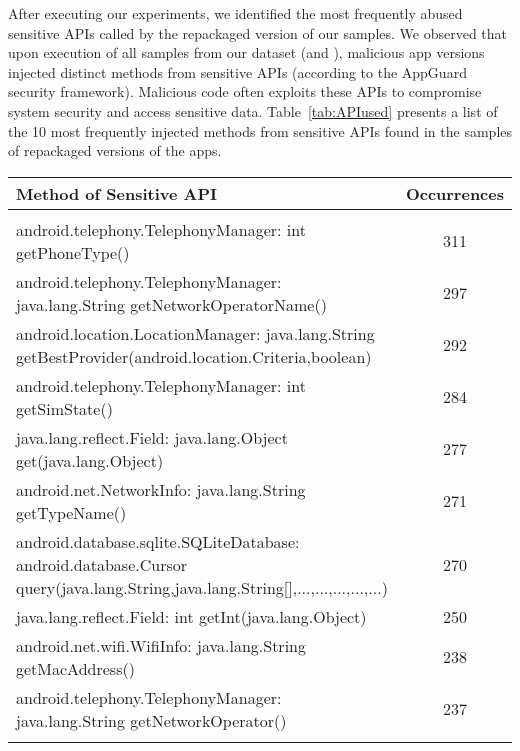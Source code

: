 After executing our experiments, we identified the  most frequently abused sensitive APIs called by the repackaged version of our samples.
We observed that upon execution of all samples from our dataset (\sds and \cds), malicious app versions injected  distinct methods from sensitive APIs (according to the
AppGuard~\cite{DBLP:conf/esorics/BackesGHMS13} security framework).
Malicious code often exploits these APIs to compromise system security and access sensitive data. Table~\ref{tab:APIused}
presents a list of the 10 most frequently injected methods from sensitive APIs found in the
\cds samples of repackaged versions of the apps.



\begin{sidewaystable}
\caption{Sensitive APIs that frequently appear in the repackaged versions of the apps. The
    \emph{Occurrences} column gives the number of distinct repackaged apps that introduce a call
  to a sensitive method.}\label{tab:APIused}
\begin{tabular*}{\textheight}{@{\extracolsep\fill}lc}

 \hline
    Method of Sensitive API & Occurrences \\
    \hline \\
    android.telephony.TelephonyManager: int getPhoneType() &  311\\
    android.telephony.TelephonyManager: java.lang.String getNetworkOperatorName() &  297 \\
    android.location.LocationManager: java.lang.String getBestProvider(android.location.Criteria,boolean) &  292 \\
    android.telephony.TelephonyManager: int getSimState() &	284\\
 java.lang.reflect.Field: java.lang.Object get(java.lang.Object)&	277\\
    android.net.NetworkInfo: java.lang.String getTypeName() &  271\\
    android.database.sqlite.SQLiteDatabase: android.database.Cursor query(java.lang.String,java.lang.String[],...,...,...,...,...) &  270 \\
       java.lang.reflect.Field: int getInt(java.lang.Object) &  250\\
        android.net.wifi.WifiInfo: java.lang.String getMacAddress()	& 238\\
    
    android.telephony.TelephonyManager: java.lang.String getNetworkOperator() &  237\\


\botrule
\end{tabular*}

\end{sidewaystable}





